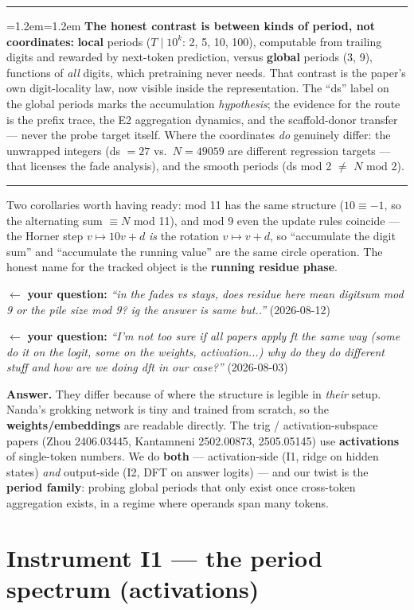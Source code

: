 \documentclass[11pt]{article}
\newcommand{\yourq}[2]{%
  \par\vspace{4pt}\noindent
  \textcolor{qcol}{$\leftarrow$ \textbf{your question:}
  \textit{``#1''}\; \textnormal{(#2)}}\par\vspace{4pt}}
\newenvironment{keybox}
  {\par\vspace{7pt}\noindent\hrule\vspace{5pt}%
   \begingroup\leftskip=1.2em\rightskip=1.2em\noindent\ignorespaces}
  {\par\endgroup\vspace{5pt}\hrule\vspace{7pt}}
\begin{document}
\begin{keybox}
\textbf{The honest contrast is between kinds of period, not coordinates:}
\textbf{local} periods ($T \mid 10^k$: 2, 5, 10, 100), computable from trailing
digits and rewarded by next-token prediction, versus \textbf{global} periods
(3, 9), functions of \emph{all} digits, which pretraining never needs. That
contrast is the paper's own digit-locality law, now visible inside the
representation. The ``ds'' label on the global periods marks the accumulation
\emph{hypothesis}; the evidence for the route is the prefix trace, the E2
aggregation dynamics, and the scaffold-donor transfer --- never the probe target
itself. Where the coordinates \emph{do} genuinely differ: the unwrapped integers
(ds $= 27$ vs.\ $N = 49059$ are different regression targets --- that licenses
the fade analysis), and the smooth periods (ds mod 2 $\ne$ $N$ mod 2).
\end{keybox}

Two corollaries worth having ready: mod 11 has the same structure ($10 \equiv -1$,
so the alternating sum $\equiv N$ mod 11), and mod 9 even the update rules
coincide --- the Horner step $v \mapsto 10v + d$ \emph{is} the rotation
$v \mapsto v + d$, so ``accumulate the digit sum'' and ``accumulate the running
value'' are the same circle operation. The honest name for the tracked object is
the \textbf{running residue phase}.

\yourq{in the fades vs stays, does residue here mean digitsum mod 9 or the pile
size mod 9? ig the answer is same but..}{2026-08-12}

\yourq{I'm not too sure if all papers apply ft the same way (some do it on the
logit, some on the weights, activation...) why do they do different stuff and how
are we doing dft in our case?}{2026-08-03}

\noindent\textbf{Answer.} They differ because of where the structure is legible in
\emph{their} setup. Nanda's grokking network is tiny and trained from scratch, so
the \textbf{weights/embeddings} are readable directly. The trig / activation-subspace
papers (Zhou 2406.03445, Kantamneni 2502.00873, 2505.05145) use \textbf{activations}
of single-token numbers. We do \textbf{both} --- activation-side (I1, ridge on
hidden states) \emph{and} output-side (I2, DFT on answer logits) --- and our twist
is the \textbf{period family}: probing global periods that only exist once
cross-token aggregation exists, in a regime where operands span many tokens.

\section{Instrument I1 --- the period spectrum (activations)}
\label{sec:i1}
\end{document}

